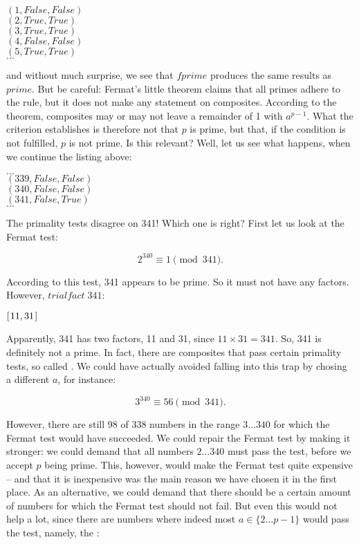 \documentclass{scrreprt}
\newcommand{\Conid}[1]{\mathit{#1}}
\newcommand{\Varid}[1]{\mathit{#1}}
\begin{document}
\ensuremath{(\mathrm{1},\Conid{False},\Conid{False})}\\
\ensuremath{(\mathrm{2},\Conid{True},\Conid{True})}\\
\ensuremath{(\mathrm{3},\Conid{True},\Conid{True})}\\
\ensuremath{(\mathrm{4},\Conid{False},\Conid{False})}\\
\ensuremath{(\mathrm{5},\Conid{True},\Conid{True})}\\
$\dots$

and without much surprise, we see that \ensuremath{\Varid{fprime}} produces
the same results as \ensuremath{\Varid{prime}}.
But be careful: Fermat's little theorem claims
that all primes adhere to the rule, but
it does not make any statement on composites.
According to the theorem, composites may or may not
leave a remainder of 1 with $a^{p-1}$.
What the criterion establishes is therefore not
that $p$ is prime, but that, if the condition is not fulfilled,
$p$ is not prime.
Is this relevant? Well, let us see what happens,
when we continue the listing above:

$\dots$\\
\ensuremath{(\mathrm{339},\Conid{False},\Conid{False})}\\
\ensuremath{(\mathrm{340},\Conid{False},\Conid{False})}\\
\ensuremath{(\mathrm{341},\Conid{False},\Conid{True})}\\
$\dots$

The primality tests disagree on 341!
Which one is right?
First let us look at the Fermat test:

\[
2^{340} \equiv 1 \pmod{341}.
\]

According to this test, 341 appears to be prime.
So it must not have any factors. However, \ensuremath{\Varid{trialfact}\;\mathrm{341}}: 

\ensuremath{[\mskip1.5mu \mathrm{11},\mathrm{31}\mskip1.5mu]}

Apparently, 341 has two factors, 11 and 31, since
$11 \times 31 = 341$.
So, 341 is definitely not a prime.
In fact, there are composites that pass certain primality tests,
so called . 
We could have actually avoided falling into this trap
by chosing a different $a$, for instance:

\[
3^{340} \equiv 56 \pmod{341}.
\]

However, there are still 98 of 338 numbers 
in the range $3\dots 340$
for which the Fermat test would have succeeded.
We could repair the Fermat test by making it stronger:
we could demand that all numbers $2\dots 340$ must pass the test,
before we accept $p$ being prime.
This, however, would make the Fermat test quite expensive --
and that it is inexpensive was the main reason we have chosen it
in the first place.
As an alternative, we could demand that there should be 
a certain amount of numbers for which the Fermat test should not fail.
But even this would not help a lot, since there are numbers
where indeed most $a \in \lbrace 2\dots p-1\rbrace$ would pass the test,
namely, the : 
\end{document}

